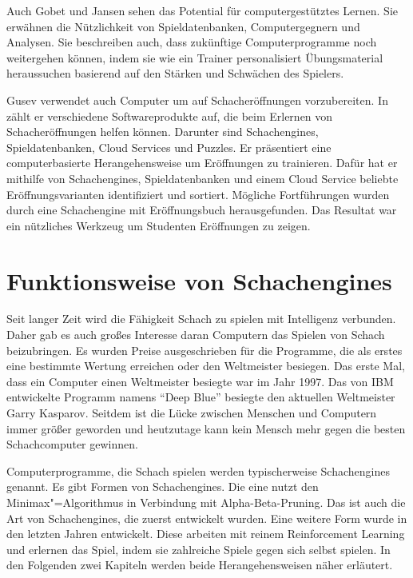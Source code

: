 Auch Gobet und Jansen sehen das Potential für computergestütztes Lernen. Sie erwähnen die Nützlichkeit von Spieldatenbanken, Computergegnern und Analysen. Sie beschreiben auch, dass zukünftige Computerprogramme noch weitergehen können, indem sie wie ein Trainer personalisiert Übungsmaterial heraussuchen basierend auf den Stärken und Schwächen des Spielers.
\cite{gobet_training_2006} 

Gusev verwendet auch Computer um auf Schacheröffnungen vorzubereiten. In \cite{gusev_using_2021} zählt er verschiedene Softwareprodukte auf, die beim Erlernen von Schacheröffnungen helfen können. Darunter sind Schachengines, Spieldatenbanken, Cloud Services und Puzzles. Er präsentiert eine computerbasierte Herangehensweise um Eröffnungen zu trainieren. Dafür hat er mithilfe von Schachengines, Spieldatenbanken und einem Cloud Service beliebte Eröffnungsvarianten identifiziert und sortiert. Mögliche Fortführungen wurden durch eine Schachengine mit Eröffnungsbuch herausgefunden. Das Resultat war ein nützliches Werkzeug um Studenten Eröffnungen zu zeigen.

\section{Funktionsweise von Schachengines}
Seit langer Zeit wird die Fähigkeit Schach zu spielen mit Intelligenz verbunden.
Daher gab es auch großes Interesse daran Computern das Spielen von Schach beizubringen.
Es wurden Preise ausgeschrieben für die Programme, die als erstes eine bestimmte Wertung erreichen oder den Weltmeister besiegen. Das erste Mal, dass ein Computer einen Weltmeister besiegte war im Jahr 1997. Das von IBM entwickelte Programm namens \enquote{Deep Blue} besiegte den aktuellen Weltmeister Garry Kasparov. Seitdem ist die Lücke zwischen Menschen und Computern immer größer geworden und heutzutage kann kein Mensch mehr gegen die besten Schachcomputer gewinnen.
\cite{vjekoslav_nemec_history_2019}

Computerprogramme, die Schach spielen werden typischerweise Schachengines genannt. Es gibt Formen von Schachengines. Die eine nutzt den Minimax"=Algorithmus in Verbindung mit Alpha-Beta-Pruning. Das ist auch die Art von Schachengines, die zuerst entwickelt wurden. Eine weitere Form wurde in den letzten Jahren entwickelt. Diese arbeiten mit reinem Reinforcement Learning und erlernen das Spiel, indem sie zahlreiche Spiele gegen sich selbst spielen. In den Folgenden zwei Kapiteln werden beide Herangehensweisen näher erläutert.

